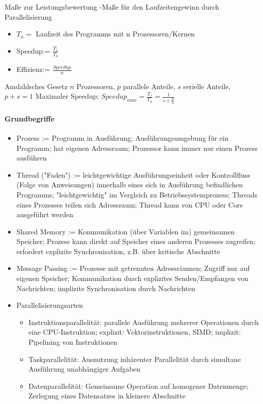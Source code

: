 \documentclass[10pt]{article}
\begin{document}
Maße zur Leistungsbewertung
-Maße für den Laufzeitengewinn durch Parallelisierung
\begin{itemize}
  \item $T_n=$ Laufzeit des Programms mit n Prozessoren/Kernen
  \item Speedup:= $\frac{T_1}{T_n}$
  \item Effizienz:= $\frac{Speedup}{n}$
\end{itemize}

Amdahlsches Gesetz
$n$ Prozessoren, $p$ parallele Anteile, $s$ serielle Anteile, $p+s=1$
Maximaler Speedup: $Speedup_{max}=\frac{T_1}{T_n}=\frac{1}{s+\frac{p}{n}}$

\paragraph{Grundbegriffe}
\begin{itemize}
  \item Prozess := Programm in Ausführung; Ausführungsumgebung für ein Programm; hat eigenen Adressraum; Prozessor kann immer nur einen Prozess ausführen
  \item Thread ("Faden") := leichtgewichtige Ausführungseinheit oder Kontrollfluss (Folge von Anweisungen) innerhalb eines sich in Ausführung befindlichen Programms; "leichtgewichtig" im Vergleich zu Betriebssystemprozess; Threads eines Prozesses teilen sich Adressraum; Thread kann von CPU oder Core ausgeführt werden
  \item Shared Memory := Kommunikation (über Variablen im) gemeinsamen Speicher; Prozess kann direkt auf Speicher eines anderen Prozesses zugreifen; erfordert explizite Synchronisation, z.B. über kritische Abschnitte
  \item Message Passing := Prozesse mit getrennten Adressräumen; Zugriff nur auf eigenen Speicher; Kommunikation durch explizites Senden/Empfangen von Nachrichten; implizite Synchronisation durch Nachrichten
  \item Parallelisierungsarten
        \begin{itemize}
          \item Instruktionsparallelität: parallele Ausführung mehrerer Operationen durch eine CPU-Instruktion; explizit: Vektorinstruktionen, SIMD; implizit: Pipelining von Instruktionen
          \item Taskparallelität: Ausnutzung inhärenter Parallelität durch simultane Ausführung unabhängiger Aufgaben
          \item Datenparallelität: Gemeinsame Operation auf homogener Datenmenge; Zerlegung eines Datensatzes in kleinere Abschnitte
        \end{itemize}
\end{itemize}
\end{document}

